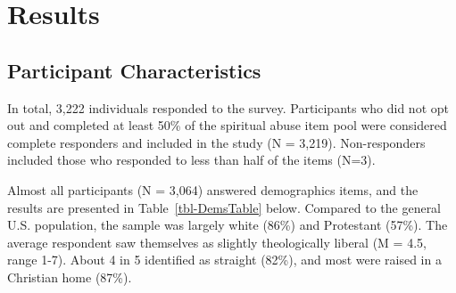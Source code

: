 \documentclass[
  letterpaper,
  DIV=11,
  numbers=noendperiod]{scrreport}
\begin{document}

\hypertarget{results}{%
\chapter*{Results}\label{results}}

\hypertarget{participant-characteristics}{%
\section*{Participant
Characteristics}\label{participant-characteristics}}

In total, 3,222 individuals responded to the survey. Participants who
did not opt out and completed at least 50\% of the spiritual abuse item
pool were considered complete responders and included in the study (N =
3,219). Non-responders included those who responded to less than half of
the items (N=3).

Almost all participants (N = 3,064) answered demographics items, and the
results are presented in Table~\ref{tbl-DemsTable} below. Compared to
the general U.S. population, the sample was largely white (86\%) and
Protestant (57\%). The average respondent saw themselves as slightly
theologically liberal (M = 4.5, range 1-7). About 4 in 5 identified as
straight (82\%), and most were raised in a Christian home (87\%).
\end{document}
